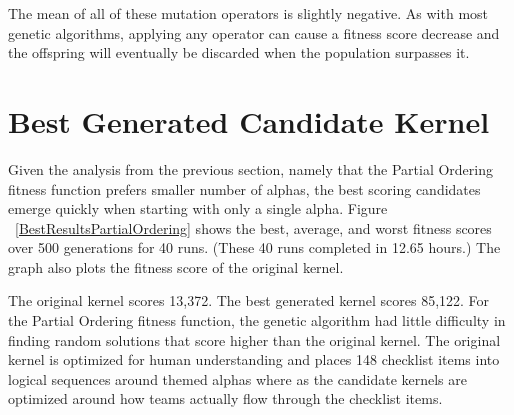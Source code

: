 \documentclass[preprint,12pt,3p]{elsarticle}
\begin{document}
The mean of all of these mutation operators is slightly negative. As with most genetic algorithms, applying any operator can cause a fitness score decrease and the offspring will eventually be discarded when the population surpasses it.




\section{Best Generated Candidate Kernel}

Given the analysis from the previous section, namely that the Partial Ordering fitness function prefers smaller number of alphas, the best scoring candidates emerge quickly when starting with only a single alpha. Figure ~\ref{BestResultsPartialOrdering} shows the best, average, and worst fitness scores over 500 generations for 40 runs. (These 40 runs completed in 12.65 hours.) The graph also plots the fitness score of the original kernel.

The original kernel scores 13,372. The best generated kernel scores 85,122. For the Partial Ordering fitness function, the genetic algorithm had little difficulty in finding random solutions that score higher than the original kernel. The original kernel is optimized for human understanding and places 148 checklist items into logical sequences around themed alphas where as the candidate kernels are optimized around how teams actually flow through the checklist items.
\end{document}
